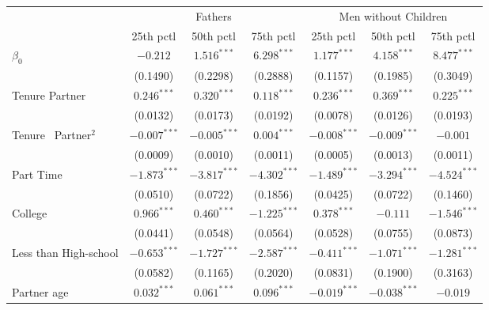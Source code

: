 \begin{tabular}{l|ccc|ccc}
\toprule
{} & \multicolumn{3}{c}{Fathers} & \multicolumn{3}{c}{Men without Children} \\
{} &       25th pctl &       50th pctl &       75th pctl &            25th pctl &       50th pctl &       75th pctl \\
\midrule
$\beta_0$                     &        $-0.212$ &   $1.516^{***}$ &   $6.298^{***}$ &        $1.177^{***}$ &   $4.158^{***}$ &   $8.477^{***}$ \\
                              &        (0.1490) &        (0.2298) &        (0.2888) &             (0.1157) &        (0.1985) &        (0.3049) \\
Tenure Partner                &   $0.246^{***}$ &   $0.320^{***}$ &   $0.118^{***}$ &        $0.236^{***}$ &   $0.369^{***}$ &   $0.225^{***}$ \\
                              &        (0.0132) &        (0.0173) &        (0.0192) &             (0.0078) &        (0.0126) &        (0.0193) \\
Tenure \ Partner$^{2}$        &  $-0.007^{***}$ &  $-0.005^{***}$ &   $0.004^{***}$ &       $-0.008^{***}$ &  $-0.009^{***}$ &        $-0.001$ \\
                              &        (0.0009) &        (0.0010) &        (0.0011) &             (0.0005) &        (0.0013) &        (0.0011) \\
Part Time                     &  $-1.873^{***}$ &  $-3.817^{***}$ &  $-4.302^{***}$ &       $-1.489^{***}$ &  $-3.294^{***}$ &  $-4.524^{***}$ \\
                              &        (0.0510) &        (0.0722) &        (0.1856) &             (0.0425) &        (0.0722) &        (0.1460) \\
College                       &   $0.966^{***}$ &   $0.460^{***}$ &  $-1.225^{***}$ &        $0.378^{***}$ &        $-0.111$ &  $-1.546^{***}$ \\
                              &        (0.0441) &        (0.0548) &        (0.0564) &             (0.0528) &        (0.0755) &        (0.0873) \\
Less than High-school         &  $-0.653^{***}$ &  $-1.727^{***}$ &  $-2.587^{***}$ &       $-0.411^{***}$ &  $-1.071^{***}$ &  $-1.281^{***}$ \\
                              &        (0.0582) &        (0.1165) &        (0.2020) &             (0.0831) &        (0.1900) &        (0.3163) \\
Partner age                   &   $0.032^{***}$ &   $0.061^{***}$ &   $0.096^{***}$ &       $-0.019^{***}$ &  $-0.038^{***}$ &        $-0.019$ \\

\end{tabular}
